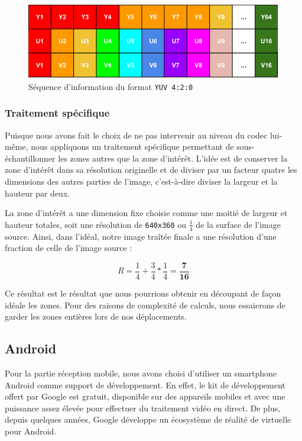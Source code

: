 \documentclass[11pt,a4paper]{article}
\begin{document}
\begin{figure}[H]
\begin{center}
\includegraphics[scale=0.5]{images/yuv2.png}
\end{center}
\caption{Séquence d'information du format \texttt{YUV 4:2:0}}
\label{}
\end{figure}

\bigbreak

\subsubsection{Traitement spécifique}
Puisque nous avons fait le choix de ne pas intervenir au niveau du codec lui-même, nous appliquons un traitement spécifique permettant de sous-échantillonner les zones autres que la zone d'intérêt.
L'idée est de conserver la zone d'intérêt dans sa résolution originelle et de diviser par un facteur quatre les dimensions des autres parties de l'image, c'est-à-dire diviser la largeur et la hauteur par deux.

\bigbreak
La zone d'intérêt a une dimension fixe choisie comme une moitié de largeur et hauteur totales, soit une résolution de \texttt{640x360} ou $\frac{1}{4}$ de la surface de l'image source.
Ainsi, dans l'idéal, notre image traîtée finale a une résolution d'une fraction de celle de l'image source :

$$ R = \frac{1}{4} + \frac{3}{4}*\frac{1}{4} = \mathbf{\frac{7}{16}} $$

Ce résultat est le résultat que nous pourrions obtenir en découpant de façon idéale les zones.
Pour des raisons de complexité de calculs, nous essaierons de garder les zones entières lors de nos déplacements.


\subsection{Android}
Pour la partie réception mobile, nous avons choisi d'utiliser un smartphone Android comme support de développement.
En effet, le kit de développement offert par Google est gratuit, disponible sur des appareils mobiles et avec une puissance assez élevée pour effectuer du traitement vidéo en direct.
De plus, depuis quelques années, Google développe un écosystème de réalité de virtuelle pour Android.
\end{document}
